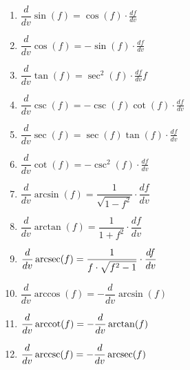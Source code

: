 \documentclass[handout,nooutcomes,noauthor,12pt]{ximera}
\begin{document}
\begin{enumerate}[label=\arabic*.]
		\item $\dfrac{d}{dv}\sin(f) = \cos(f) \cdot \frac{df}{dv}$
		\vspace{5mm}
		\item $\dfrac{d}{dv}\cos(f) = -\sin(f) \cdot \frac{df}{dv}$
		\vspace{5mm}
		\item $\dfrac{d}{dv}\tan(f) = \sec^2(f) \cdot \frac{df}{dv}f$
		\vspace{5mm}
		\item $\dfrac{d}{dv}\csc(f) = -\csc(f)\cot(f) \cdot \frac{df}{dv}$
		\vspace{5mm}
		\item $\dfrac{d}{dv}\sec(f) = \sec(f)\tan(f) \cdot \frac{df}{dv}$
		\vspace{5mm}
		\item $\dfrac{d}{dv}\cot(f) = -\csc^2(f) \cdot \frac{df}{dv}$
		\item $ \dfrac{d}{dv}\arcsin(f) = \dfrac{1}{\sqrt{1-f^2}} \cdot \dfrac{df}{dv} $
		\vspace{5mm}
		\item $ \dfrac{d}{dv}\arctan(f) = \dfrac{1}{1+f^2} \cdot \dfrac{df}{dv} $
		\vspace{5mm}
		\item $ \dfrac{d}{dv}\operatorname{arcsec}(f) = \dfrac{1}{f \cdot \sqrt{f^2-1}} \cdot \dfrac{df}{dv} $
		\vspace{5mm}
		\item $ \dfrac{d}{dv}\arccos(f) = -\dfrac{d}{dv}\arcsin(f)$
		\vspace{5mm}
		\item $ \dfrac{d}{dv}\operatorname{arccot}(f) = -\dfrac{d}{dv}\arctan(f)$
		\vspace{5mm}
		\item $ \dfrac{d}{dv}\operatorname{arccsc}(f) = -\dfrac{d}{dv}\operatorname{arcsec}(f)$
		\vspace{5mm}
	\end{enumerate}
\end{document}
